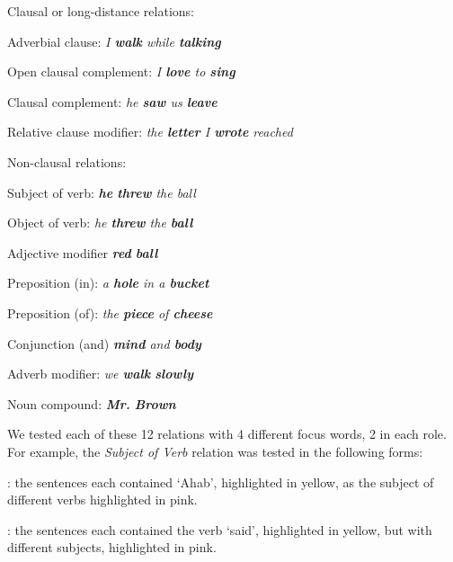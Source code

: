 

Clausal or long-distance relations:
\squishlist
	\item Adverbial clause: \emph{ I \textbf{walk} while \textbf{talking}}
	\item Open clausal complement:  \emph{I \textbf{love} to \textbf{sing} }
	\item  Clausal complement:  \emph{ he \textbf{saw} us \textbf{leave}}
	\item  Relative clause modifier:  \emph{the \textbf{letter} I \textbf{wrote} reached }
\squishend

Non-clausal relations:
\squishlist
	\item Subject of verb: \emph{\textbf{he} \textbf{threw} the ball}
	\item Object of verb:  \emph{ he \textbf{threw} the \textbf{ball}}
	\item Adjective modifier \emph{\textbf{red} \textbf{ball}}
	\item Preposition (in): \emph{a \textbf{hole} in a \textbf{bucket}}
	\item Preposition (of):  \emph{ the \textbf{piece} of \textbf{cheese}}
	\item Conjunction (and)  \emph{ \textbf{mind} and \textbf{body}}
	\item Adverb modifier: \emph{  we \textbf{walk} \textbf{slowly}}
	\item Noun compound:  \emph{ \textbf{Mr.}  \textbf{Brown}}
\squishend

We tested each of these 12 relations with 4 different focus words, 2 in each role. For example, the \emph{Subject of Verb} relation  was tested in the following forms:
\squishlist
	\item {}:  the sentences each contained `Ahab', highlighted in yellow, as the subject of different verbs highlighted in pink.
	\item {}

	\item {}: the sentences each contained the verb `said', highlighted in yellow, but with different subjects, highlighted in pink.
	\item {}
\squishend

